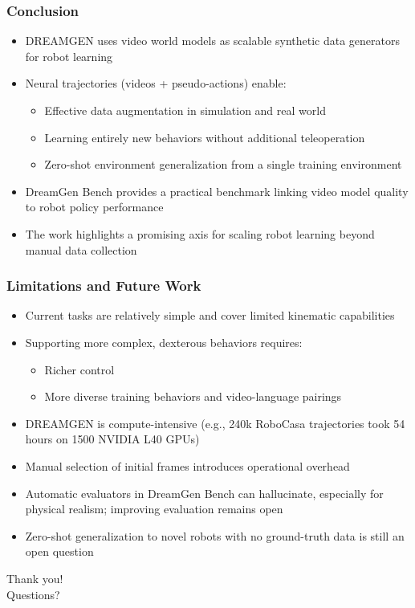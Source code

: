 \documentclass{beamer}
\begin{document}
\begin{frame}
  \frametitle{Conclusion}
  \small
  \begin{itemize}
    \item DREAMGEN uses video world models as scalable synthetic data generators for robot learning
    \item Neural trajectories (videos + pseudo-actions) enable:
      \begin{itemize}
        \item Effective data augmentation in simulation and real world
        \item Learning entirely new behaviors without additional teleoperation
        \item Zero-shot environment generalization from a single training environment
      \end{itemize}
    \item DreamGen Bench provides a practical benchmark linking video model quality to robot policy performance
    \item The work highlights a promising axis for scaling robot learning beyond manual data collection
  \end{itemize}
\end{frame}

\begin{frame}
  \frametitle{Limitations and Future Work}
  \small
  \begin{itemize}
    \item Current tasks are relatively simple and cover limited kinematic capabilities
    \item Supporting more complex, dexterous behaviors requires:
      \begin{itemize}
        \item Richer control
        \item More diverse training behaviors and video-language pairings
      \end{itemize}
    \item DREAMGEN is compute-intensive (e.g., 240k RoboCasa trajectories took 54 hours on 1500 NVIDIA L40 GPUs)
    \item Manual selection of initial frames introduces operational overhead
    \item Automatic evaluators in DreamGen Bench can hallucinate, especially for physical realism; improving evaluation remains open
    \item Zero-shot generalization to novel robots with no ground-truth data is still an open question
  \end{itemize}
\end{frame}

\begin{frame}
  \centering
  \Large Thank you!\\[1em]
  \normalsize Questions?
\end{frame}

\end{document}
